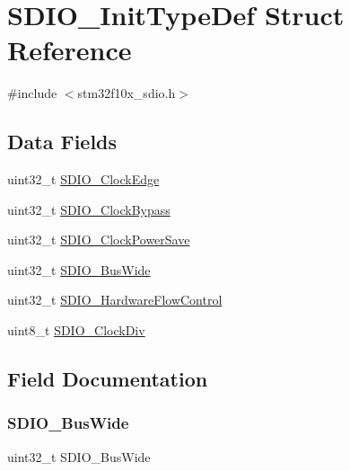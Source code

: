 \hypertarget{struct_s_d_i_o___init_type_def}{}\section{S\+D\+I\+O\+\_\+\+Init\+Type\+Def Struct Reference}
\label{struct_s_d_i_o___init_type_def}


{\ttfamily \#include $<$stm32f10x\+\_\+sdio.\+h$>$}

\subsection*{Data Fields}
\begin{DoxyCompactItemize}
\item 
uint32\+\_\+t \mbox{\hyperlink{struct_s_d_i_o___init_type_def_a9005baa5fb30fb068fbdbbf8856c651e}{S\+D\+I\+O\+\_\+\+Clock\+Edge}}
\item 
uint32\+\_\+t \mbox{\hyperlink{struct_s_d_i_o___init_type_def_a30c395781536ad414f2dba26b1ad1e72}{S\+D\+I\+O\+\_\+\+Clock\+Bypass}}
\item 
uint32\+\_\+t \mbox{\hyperlink{struct_s_d_i_o___init_type_def_a31edc8c1d4672ddb1ea60e22585398af}{S\+D\+I\+O\+\_\+\+Clock\+Power\+Save}}
\item 
uint32\+\_\+t \mbox{\hyperlink{struct_s_d_i_o___init_type_def_ad128ddfd60ebdf846d0f07548ef9cf66}{S\+D\+I\+O\+\_\+\+Bus\+Wide}}
\item 
uint32\+\_\+t \mbox{\hyperlink{struct_s_d_i_o___init_type_def_a2acacb64a58fbff9d7a31e6e0c0a3d2e}{S\+D\+I\+O\+\_\+\+Hardware\+Flow\+Control}}
\item 
uint8\+\_\+t \mbox{\hyperlink{struct_s_d_i_o___init_type_def_a9f37419ca4d1fa1d39f93c12c2b2e91b}{S\+D\+I\+O\+\_\+\+Clock\+Div}}
\end{DoxyCompactItemize}


\subsection{Field Documentation}
\mbox{\label{struct_s_d_i_o___init_type_def_ad128ddfd60ebdf846d0f07548ef9cf66}} 
\subsubsection{\texorpdfstring{SDIO\_BusWide}{SDIO\_BusWide}}
{\footnotesize\ttfamily uint32\+\_\+t S\+D\+I\+O\+\_\+\+Bus\+Wide}

